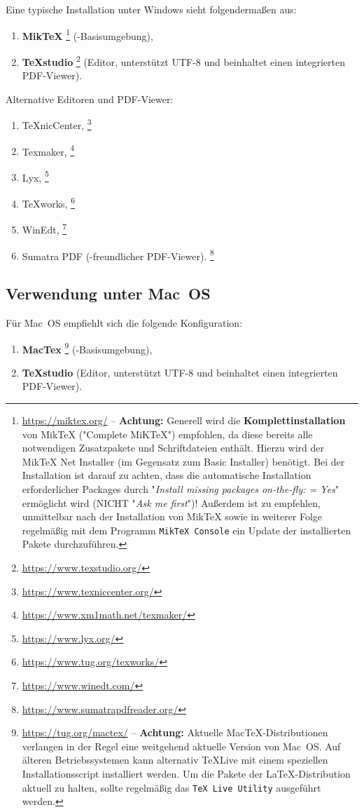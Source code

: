 Eine typische Installation unter Windows sieht folgendermaßen aus:
%
\begin{enumerate}
\item \textbf{MikTeX}%
	\footnote{\url{https://miktex.org/} -- \textbf{Achtung:} 
	Generell wird die \textbf{Komplettinstallation} von MikTeX ("Complete MiKTeX") empfohlen, 
	da diese bereits alle notwendigen Zusatzpakete und Schriftdateien enthält. Hierzu wird der
	MikTeX Net Installer (im Gegensatz zum Basic Installer) benötigt.
	Bei der Installation ist darauf zu achten, 
	dass die automatische Installation erforderlicher Packages 
	durch "\emph{Install missing packages on-the-fly: = Yes}" ermöglicht wird (NICHT "\emph{Ask me first}")!
	Außerdem ist zu empfehlen, unmittelbar nach der Installation von MikTeX sowie in weiterer Folge regelmäßig
	mit dem Programm \texttt{MikTeX Console} ein Update der installierten Pakete durchzuführen.}
	(\latex-Basisumgebung),
\item \textbf{TeXstudio}%
	\footnote{\url{https://www.texstudio.org/}}
	(Editor, unterstützt UTF-8 und beinhaltet einen integrierten PDF-Viewer).
\end{enumerate}

Alternative Editoren und PDF-Viewer:
%
\begin{enumerate}
	\item TeXnicCenter,%
	\footnote{\url{https://www.texniccenter.org/}}
	\item Texmaker,%
	\footnote{\url{https://www.xm1math.net/texmaker/}}
	\item Lyx,%
	\footnote{\url{https://www.lyx.org/}}
	\item TeXworks,%
	\footnote{\url{https://www.tug.org/texworks/}}
	\item WinEdt,%
	\footnote{\url{https://www.winedt.com/}}
	\item Sumatra PDF (\latex-freundlicher PDF-Viewer).%
	\footnote{\url{https://www.sumatrapdfreader.org/}}
\end{enumerate}

\subsection{Verwendung unter Mac~OS}

Für Mac~OS empfiehlt sich die folgende Konfiguration:
%
\begin{enumerate}
\item 
	\textbf{MacTex}%
	\footnote{\url{https://tug.org/mactex/} -- \textbf{Achtung:} Aktuelle MacTeX-Distributionen verlangen in
		der Regel eine weitgehend aktuelle Version von Mac~OS. Auf älteren Betriebssystemen kann alternativ
		TeXLive mit einem speziellen Installationsscript installiert werden.
		Um die Pakete der \LaTeX-Distribution aktuell zu halten, sollte regelmäßig das \texttt{TeX Live Utility}
		ausgeführt werden.}
	(\latex-Basisumgebung),
\item \textbf{TeXstudio}%
	(Editor, unterstützt UTF-8 und beinhaltet einen integrierten PDF-Viewer).
\end{enumerate}

